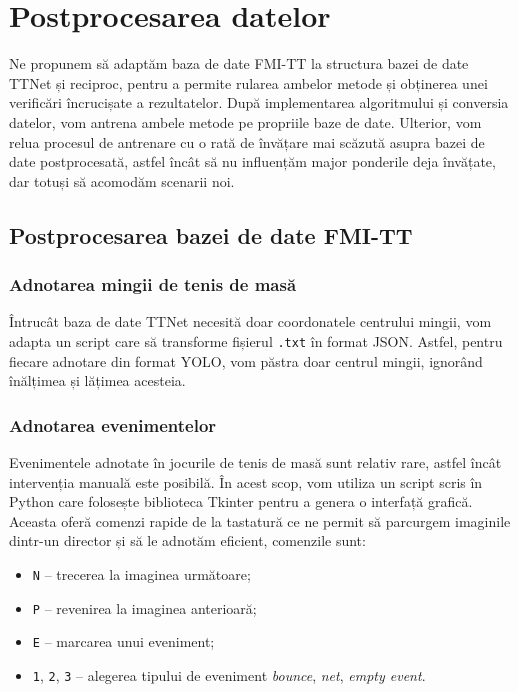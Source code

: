 \section{Postprocesarea datelor}

Ne propunem să adaptăm baza de date FMI-TT la structura bazei de date TTNet și reciproc, pentru a permite rularea ambelor metode și obținerea unei verificări încrucișate a rezultatelor. După implementarea algoritmului și conversia datelor, vom antrena ambele metode pe propriile baze de date. Ulterior, vom relua procesul de antrenare cu o rată de învățare mai scăzută asupra bazei de date postprocesată, astfel încât să nu influențăm major ponderile deja învățate, dar totuși să acomodăm scenarii noi.

\subsection{Postprocesarea bazei de date FMI-TT}
\label{subsec:personal-dataset}

\subsubsection{Adnotarea mingii de tenis de masă}
Întrucât baza de date TTNet necesită doar coordonatele centrului mingii, vom adapta un script care să transforme fișierul \texttt{.txt} în format JSON. Astfel, pentru fiecare adnotare din format YOLO, vom păstra doar centrul mingii, ignorând înălțimea și lățimea acesteia.

\subsubsection{Adnotarea evenimentelor}
\label{subsec:event-adnotation}
Evenimentele adnotate în jocurile de tenis de masă sunt relativ rare, astfel încât intervenția manuală este posibilă. În acest scop, vom utiliza un script scris în Python care folosește biblioteca Tkinter\cite{tkinter} pentru a genera o interfață grafică. Aceasta oferă comenzi rapide de la tastatură ce ne permit să parcurgem imaginile dintr-un director și să le adnotăm eficient, comenzile sunt:
\begin{itemize}
    \item \texttt{N} – trecerea la imaginea următoare;
    \item \texttt{P} – revenirea la imaginea anterioară;
    \item \texttt{E} – marcarea unui eveniment;
    \item \texttt{1}, \texttt{2}, \texttt{3} – alegerea tipului de eveniment \textit{bounce}, \textit{net}, \textit{empty event}.
\end{itemize}

